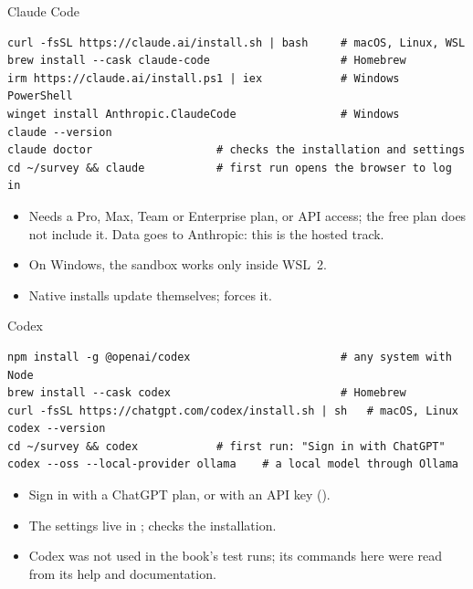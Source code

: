 \documentclass[11pt,aspectratio=169]{beamer}
\begin{document}
\begin{frame}[fragile]{Claude Code}
  \begin{lstlisting}[style=shell]
curl -fsSL https://claude.ai/install.sh | bash     # macOS, Linux, WSL
brew install --cask claude-code                    # Homebrew
irm https://claude.ai/install.ps1 | iex            # Windows PowerShell
winget install Anthropic.ClaudeCode                # Windows
claude --version
claude doctor                   # checks the installation and settings
cd ~/survey && claude           # first run opens the browser to log in
  \end{lstlisting}
  \begin{itemize}
    \item Needs a Pro, Max, Team or Enterprise plan, or API access; the free
      plan does not include it. Data goes to Anthropic: this is the hosted
      track.
    \item On Windows, the sandbox works only inside WSL~2.
    \item Native installs update themselves;  forces it.
  \end{itemize}
\end{frame}

\begin{frame}[fragile]{Codex}
  \begin{lstlisting}[style=shell]
npm install -g @openai/codex                       # any system with Node
brew install --cask codex                          # Homebrew
curl -fsSL https://chatgpt.com/codex/install.sh | sh   # macOS, Linux
codex --version
cd ~/survey && codex            # first run: "Sign in with ChatGPT"
codex --oss --local-provider ollama    # a local model through Ollama
  \end{lstlisting}
  \begin{itemize}
    \item Sign in with a ChatGPT plan, or with an API key
      ().
    \item The settings live in ;
       checks the installation.
    \item Codex was not used in the book's test runs; its commands here were
      read from its help and documentation.
  \end{itemize}
\end{frame}
\end{document}
